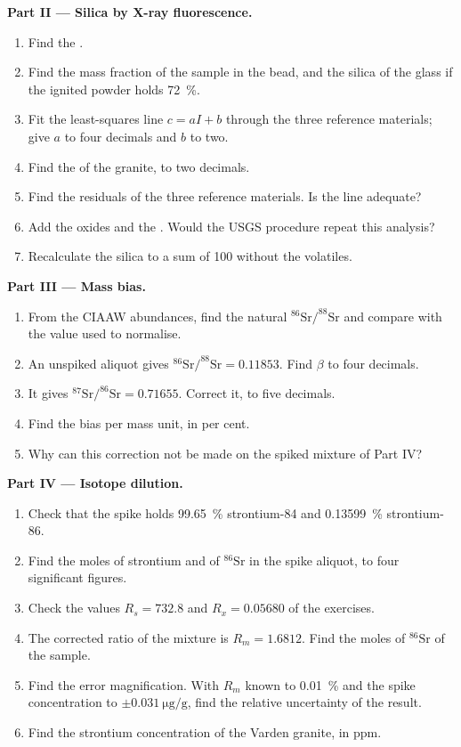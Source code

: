 \begin{problem}
\noindent\textbf{Part II --- Silica by X-ray fluorescence.}
\begin{enumerate}[resume]
  \item Find the .
  \item Find the mass fraction of the sample in the bead, and the silica of the glass if the
        ignited powder holds \qty{72}{\percent}.
  \item Fit the least-squares line $c = aI + b$ through the three reference materials; give $a$ to
        four decimals and $b$ to two.
  \item Find the  of the granite, to two decimals.
  \item Find the residuals of the three reference materials. Is the line adequate?
  \item Add the oxides and the . Would the USGS procedure repeat this analysis?
  \item Recalculate the silica to a sum of 100 without the volatiles.
\end{enumerate}

\noindent\textbf{Part III --- Mass bias.}
\begin{enumerate}[resume]
  \item From the CIAAW abundances, find the natural $^{86}\mathrm{Sr}/^{88}\mathrm{Sr}$ and compare
        with the value used to normalise.
  \item An unspiked aliquot gives $^{86}\mathrm{Sr}/^{88}\mathrm{Sr} = 0.11853$. Find $\beta$ to
        four decimals.
  \item It gives $^{87}\mathrm{Sr}/^{86}\mathrm{Sr} = 0.71655$. Correct it, to five decimals.
  \item Find the bias per mass unit, in per cent.
  \item Why can this correction not be made on the spiked mixture of Part IV?
\end{enumerate}

\noindent\textbf{Part IV --- Isotope dilution.}
\begin{enumerate}[resume]
  \item Check that the spike holds \qty{99.65}{\percent} strontium-84 and \qty{0.13599}{\percent}
        strontium-86.
  \item Find the moles of strontium and of $^{86}\mathrm{Sr}$ in the spike aliquot, to four
        significant figures.
  \item Check the values $R_s = 732.8$ and $R_x = 0.05680$ of the exercises.
  \item The corrected ratio of the mixture is $R_m = 1.6812$. Find the moles of $^{86}\mathrm{Sr}$
        of the sample.
  \item Find the error magnification. With $R_m$ known to \qty{0.01}{\percent} and the spike
        concentration to $\pm\qty{0.031}{\micro\gram\per\gram}$, find the relative uncertainty of
        the result.
  \item Find the strontium concentration of the Varden granite, in ppm.
\end{enumerate}
\end{problem}
